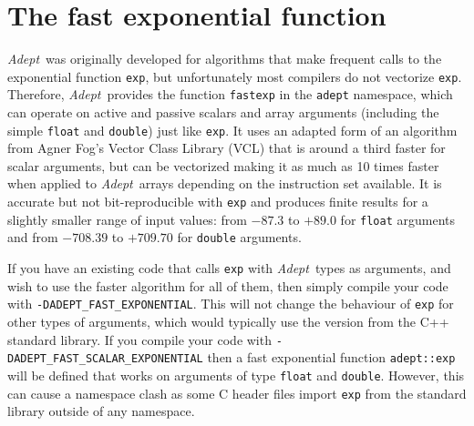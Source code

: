 \documentclass[a4,oneside]{book}
\def\codesize{\small}
\def\Adept{\emph{Adept}}
\def\code#1{{\codesize\texttt{#1}}}
\begin{document}
\section{The fast exponential function}
\label{sec:fastexp}
\Adept\ was originally developed for algorithms that make frequent
calls to the exponential function \code{exp}, but unfortunately most
compilers do not vectorize \code{exp}.  Therefore, \Adept\ provides
the function \code{fastexp} in the \code{adept} namespace, which can
operate on active and passive scalars and array arguments (including
the simple \code{float} and \code{double}) just like \code{exp}.  It
uses an adapted form of an algorithm from Agner Fog's Vector Class
Library (VCL) that is around a third faster for scalar arguments, but
can be vectorized making it as much as 10 times faster when applied to
\Adept\ arrays depending on the instruction set available.  It is
accurate but not bit-reproducible with \code{exp} and produces finite
results for a slightly smaller range of input values: from $-87.3$ to
$+89.0$ for \code{float} arguments and from $-708.39$ to $+709.70$ for
\code{double} arguments.

If you have an existing code that calls \code{exp} with \Adept\ types
as arguments, and wish to use the faster algorithm for all of them,
then simply compile your code with \code{-DADEPT\_FAST\_EXPONENTIAL}.
This will not change the behaviour of \code{exp} for other types of
arguments, which would typically use the version from the C++ standard
library. If you compile your code with
\code{-DADEPT\_FAST\_SCALAR\_EXPONENTIAL} then a fast exponential
function \code{adept::exp} will be defined that works on arguments of
type \code{float} and \code{double}.  However, this can cause a
namespace clash as some C header files import \code{exp} from the
standard library outside of any namespace.
\end{document}
